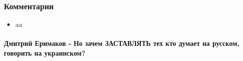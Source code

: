  
 
 
 
 
\clearpage
\subsubsection{Комментарии}
\label{sec:18_06_2020.fb.zharkih_ekaterina.1.mova_jazyk.cmt}

\begin{itemize}
\item aa

\end{itemize}

\paragraph{Дмитрий Еримаков - Но зачем ЗАСТАВЛЯТЬ тех кто думает на русском, говорить на украинском?}

